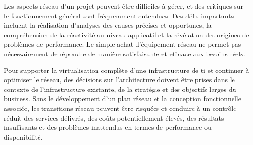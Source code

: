 Les aspects réseau d'un projet peuvent être difficiles à gérer, et des critiques sur le fonctionnement général sont fréquemment entendues. Des défis importants incluent la réalisation d'analyses des causes précises et opportunes, la compréhension de la réactivité au niveau applicatif et la révélation des origines de problèmes de performance. Le simple achat d'équipement réseau ne permet pas nécessairement de répondre de manière satisfaisante et efficace aux besoins réels.





Pour supporter la virtualisation complète d'une infrastructure de \gls{ti} et continuer à optimiser le réseau, des décisions sur l'architecture doivent être prises dans le contexte de l'infrastructure existante, de la stratégie et des objectifs larges du business. Sans le développement d'un plan réseau et la conception fonctionnelle associée, les transitions réseau peuvent être risquées et conduire à un contrôle réduit des services délivrés, des coûts potentiellement élevés, des résultats insuffisants et des problèmes inattendus en termes de performance ou disponibilité. 

